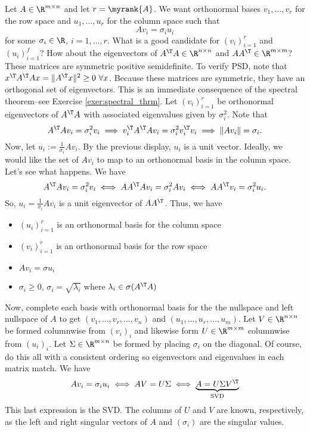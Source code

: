 Let $A\in \R^{m\times n}$ and let $r = \myrank{A}$. We want orthonormal bases $v_1,\ldots, v_r$  for the row space and $u_1,\ldots,u_r$ for the column space such that
$$
A v_i = \sigma_i u_i
$$
for some $\sigma_i \in \R$, $i=1,\ldots, r$. 
What is a good candidate for $(v_i)_{i=1}^r$ and $(u_i)_{i=1}^f$? How about the eigenvectors of  $A^\T A \in \R^{n\times n}$ and $AA^\T\in \R^{m\times m}$? These matrices are symmetric positive semidefinite. To verify PSD, note that $x^\T A^\T A x = \|A^\T x\|^2 \geq 0 ~ \forall x$. Because these matrices are symmetric, they have an orthogonal set of eigenvectors. This is an immediate consequence of the spectral theorem--see Exercise \ref{exer:spectral_thrm}. Let $(v_i)_{i=1}^r$ be orthonormal eigenvectors of $A^\T A$ with associated eigenvalues given by $\sigma_i^2$. Note that
$$
A^\T Av_i = \sigma_i^2 v_i \implies  v_i^\T A^\T A v_i = \sigma_i^2 v_i^\T v_i \implies \|A v_i\| = \sigma_i.
$$
Now, let $u_i := \frac{1}{\sigma_i}Av_i$. By the previous display, $u_i$ is a unit vector. Ideally, we would like the set of $Av_i$ to map to an orthonormal basis in the column space. Let's see what happens. We have
$$
A^\T A v_i = \sigma_i^2 v_i \iff AA^\T Av_i = \sigma_i^2 A v_i \iff A A^\T v_i = \sigma_i^2 u_i. 
$$
So, $u_i = \frac{1}{\sigma_i} A v_i$ is a unit eigenvector of $A A^\T$. Thus, we have
\begin{itemize}
  \item $(u_i)_{i=1}^r$ is an orthonormal basis for the column space
  \item $(v_i)_{i=1}^r$ is an orthonormal basis for the row space
  \item $Av_i = \sigma u_i$
  \item $\sigma_i \geq 0$, $\sigma_i = \sqrt{\lambda_i}$ where $\lambda_i \in \sigma(A^\T A)$
\end{itemize}
Now, complete each basis with orthonormal basis for the the nullspace and left nullspace of $A$ to get $(v_1,\ldots,v_r,\ldots, v_n)$ and $(u_1,\ldots, u_r, \ldots, u_m)$. Let $V\in \R^{n\times n}$ be formed columnwise from $(v_i)_i$ and likewise form $U\in \R^{m\times m}$ columnwise from $(u_i)_i$. Let $\Sigma \in \R^{m\times n}$ be formed by placing $\sigma_i$ on the diagonal. Of course, do this all with a consistent ordering so eigenvectors and eigenvalues in each matrix match. We have
$$
A v_i = \sigma_i u_i \iff AV = U\Sigma \iff \underbrace{A =  U \Sigma V^\T}_{\text{SVD}}
$$
This last expression is the SVD. The columns of $U$ and $V$ are known, respectively, as the left and right singular vectors of $A$ and $(\sigma_i)$ are the singular values. 

